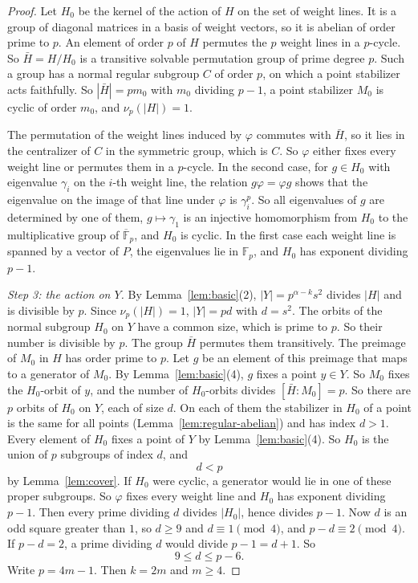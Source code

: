 \documentclass[11pt]{amsart}
\theoremstyle{definition}
\theoremstyle{remark}
\newcommand{\F}{\mathbb{F}}
\newcommand{\Kb}{\overline{\F}_p}
\begin{document}
\begin{proof}
Let $H_0$ be the kernel of the action of $H$ on the set of weight lines. It is a group of diagonal matrices in a basis of weight vectors, so it is abelian of order prime to $p$. An element of order $p$ of $H$ permutes the $p$ weight lines in a $p$-cycle. So $\bar H=H/H_0$ is a transitive solvable permutation group of prime degree $p$. Such a group has a normal regular subgroup $C$ of order $p$, on which a point stabilizer acts faithfully. So $|\bar H|=pm_0$ with $m_0$ dividing $p-1$, a point stabilizer $M_0$ is cyclic of order $m_0$, and $\nu_p(|H|)=1$.

The permutation of the weight lines induced by $\varphi$ commutes with $\bar H$, so it lies in the centralizer of $C$ in the symmetric group, which is $C$. So $\varphi$ either fixes every weight line or permutes them in a $p$-cycle. In the second case, for $g\in H_0$ with eigenvalue $\gamma_i$ on the $i$-th weight line, the relation $g\varphi=\varphi g$ shows that the eigenvalue on the image of that line under $\varphi$ is $\gamma_i^p$. So all eigenvalues of $g$ are determined by one of them, $g\mapsto\gamma_1$ is an injective homomorphism from $H_0$ to the multiplicative group of $\Kb$, and $H_0$ is cyclic. In the first case each weight line is spanned by a vector of $P$, the eigenvalues lie in $\F_p$, and $H_0$ has exponent dividing $p-1$.

\emph{Step 3: the action on $Y$.} By Lemma~\ref{lem:basic}(2), $|Y|=p^{\alpha-k}s^2$ divides $|H|$ and is divisible by $p$. Since $\nu_p(|H|)=1$, $|Y|=pd$ with $d=s^2$. The orbits of the normal subgroup $H_0$ on $Y$ have a common size, which is prime to $p$. So their number is divisible by $p$. The group $\bar H$ permutes them transitively. The preimage of $M_0$ in $H$ has order prime to $p$. Let $g$ be an element of this preimage that maps to a generator of $M_0$. By Lemma~\ref{lem:basic}(4), $g$ fixes a point $y\in Y$. So $M_0$ fixes the $H_0$-orbit of $y$, and the number of $H_0$-orbits divides $[\bar H:M_0]=p$. So there are $p$ orbits of $H_0$ on $Y$, each of size $d$. On each of them the stabilizer in $H_0$ of a point is the same for all points (Lemma~\ref{lem:regular-abelian}) and has index $d>1$. Every element of $H_0$ fixes a point of $Y$ by Lemma~\ref{lem:basic}(4). So $H_0$ is the union of $p$ subgroups of index $d$, and
\[
d<p
\]
by Lemma~\ref{lem:cover}. If $H_0$ were cyclic, a generator would lie in one of these proper subgroups. So $\varphi$ fixes every weight line and $H_0$ has exponent dividing $p-1$. Then every prime dividing $d$ divides $|H_0|$, hence divides $p-1$. Now $d$ is an odd square greater than $1$, so $d\ge9$ and $d\equiv1\pmod4$, and $p-d\equiv2\pmod4$. If $p-d=2$, a prime dividing $d$ would divide $p-1=d+1$. So
\[
9\le d\le p-6 .
\]
Write $p=4m-1$. Then $k=2m$ and $m\ge4$.


\end{proof}
\end{document}
